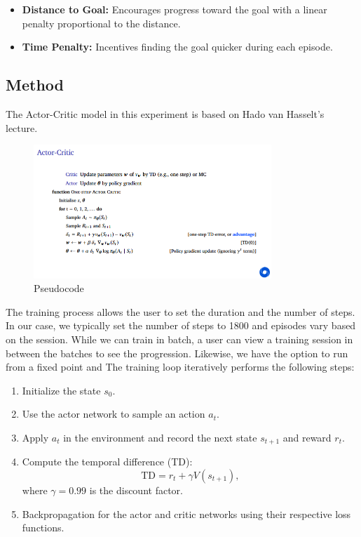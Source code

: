 \documentclass[12pt]{article}
\begin{document}
\begin{itemize}
    \item \textbf{Distance to Goal:} Encourages progress toward the goal with a linear penalty proportional to the distance.
    \item \textbf{Time Penalty:} Incentives finding the goal quicker during each episode. 
\end{itemize}

\subsection{Method}

The Actor-Critic model in this experiment is based on Hado van Hasselt's lecture. 

\begin{figure}[H]
    \centering
    \includegraphics[width=0.8\textwidth]{report/images/slide40.PNG}
    \caption{Pseudocode}
    \label{fig:slide40}
\end{figure}

The training process allows the user to set the duration and the number of steps. In our case, we typically set the number of steps to 1800 and episodes vary based on the session. While we can train in batch, a user can view a training session in between the batches to see the progression. Likewise, we have the option to run from a fixed point and The training loop iteratively performs the following steps:

\begin{enumerate}
    \item Initialize the state \(s_0\).
    \item Use the actor network to sample an action \(a_t\).
    \item Apply \(a_t\) in the environment and record the next state \(s_{t+1}\) and reward \(r_t\).
    \item Compute the temporal difference (TD):
    \[\text{TD} = r_t + \gamma V(s_{t+1}),\]
    where $\gamma=0.99$ is the discount factor.
    \item Backpropagation for the actor and critic networks using their respective loss functions.
\end{enumerate}
\end{document}
